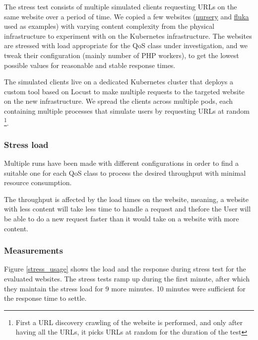 The stress test consists of multiple simulated clients requesting URLs on the same website over a period of time.
We copied a few websites (\href{https://nurseryschool.web.cern.ch/}{nursery} and \href{https://fluka.cern/}{fluka} used as examples) with varying content complexity from the physical infrastructure to experiment with on the Kubernetes infrastructure.
The websites are stressed with load appropriate for the QoS class under investigation, and we tweak their configuration (mainly number of PHP workers),
to get the lowest possible values for reasonable and stable response times.

The simulated clients live on a dedicated Kubernetes cluster that deploys a custom tool based on Locust \cite{locustio} to make multiple requests to the targeted website on the new infrastructure. 
We spread the clients across multiple pods, each containing multiple processes that simulate users by requesting URLs at random
\footnote{First a URL discovery crawling of the website is performed, and only after having all the URLs, it picks URLs at random for the duration of the test}.

\subsubsection*{Stress load}

Multiple runs have been made with different configurations in order to find a suitable one for each QoS class to process the desired throughput with minimal resource consumption.

The throughput is affected by the load times on the website, meaning, a website with less content will take less time to handle a request and thefore the User will be able to do a new request faster than it would take on a website with more content.


\subsubsection*{Measurements}
\label{sec:measurements}

Figure \ref{stress_usage} shows the load and the response during stress test for the evaluated websites.
The stress tests ramp up during the first minute, after which they maintain the stress load for 9 more minutes.
10 minutes were sufficient for the response time to settle.

